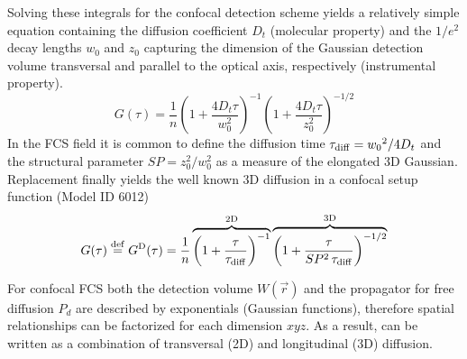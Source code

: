 Solving these integrals for the confocal detection scheme yields a relatively simple equation containing the diffusion coefficient $D_t$ (molecular property) and the $1/e^2$ decay lengths $w_0$ and $z_0$ capturing the dimension of the Gaussian detection volume transversal and parallel to the optical axis, respectively (instrumental property).
	\begin{equation}
	\label{eq9}
	G(\tau) = \frac{1}{n} \left(1+\frac{4 D_t \tau}{w_0^2} \right) ^{-1} \left(1+\frac{4D_t \tau}{z_0^2} \right)^{-1/2}
	\end{equation}
	In the FCS field it is common to define the diffusion time $\tau_{\rm diff} = {w_0}^2/4D_t$ and the structural parameter $SP=z_0^2/w_0^2$ as a measure of the elongated 3D Gaussian. Replacement finally yields the well known 3D diffusion in a confocal setup function (Model ID 6012)
	\begin{equation}
	\label{eq10}
	G(\tau) \stackrel{\rm def}{=} G^{\rm D}(\tau) = \frac{1}{n} \overbrace{ \left(1+\frac{\tau}{\tau_{\rm {diff}}} \right) ^{-1}}^{\rm 2D} \overbrace{ \left(1+\frac{\tau}{SP^2 \, \tau_{\rm {diff}}} \right)^{-1/2}}^{\rm 3D}
	\end{equation}

For confocal FCS both the detection volume $W(\vec{r})$ and the propagator for free diffusion $P_d$ are described by exponentials (Gaussian functions), therefore spatial relationships can be factorized for each dimension $xyz$. As a result,  can be written as a combination of transversal (2D) and longitudinal (3D) diffusion.

